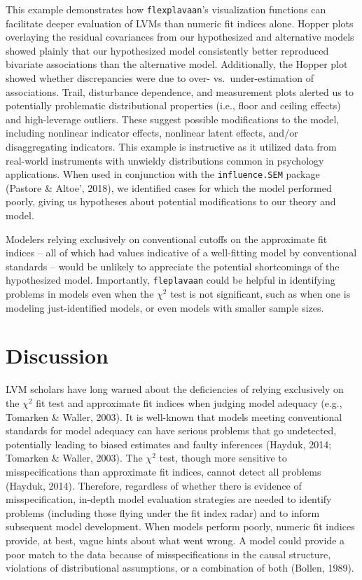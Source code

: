 \documentclass[
  english,
  man]{apa6}
\begin{document}
This example demonstrates how \texttt{flexplavaan}'s visualization functions can facilitate deeper evaluation of LVMs than numeric fit indices alone. Hopper plots overlaying the residual covariances from our hypothesized and alternative models showed plainly that our hypothesized model consistently better reproduced bivariate associations than the alternative model. Additionally, the Hopper plot showed whether discrepancies were due to over- vs.~under-estimation of associations. Trail, disturbance dependence, and measurement plots alerted us to potentially problematic distributional properties (i.e., floor and ceiling effects) and high-leverage outliers. These suggest possible modifications to the model, including nonlinear indicator effects, nonlinear latent effects, and/or disaggregating indicators. This example is instructive as it utilized data from real-world instruments with unwieldy distributions common in psychology applications. When used in conjunction with the \texttt{influence.SEM} package (Pastore \& Altoe', 2018), we identified cases for which the model performed poorly, giving us hypotheses about potential modifications to our theory and model.

Modelers relying exclusively on conventional cutoffs on the approximate fit indices -- all of which had values indicative of a well-fitting model by conventional standards -- would be unlikely to appreciate the potential shortcomings of the hypothesized model. Importantly, \texttt{fleplavaan} could be helpful in identifying problems in models even when the \(\chi^2\) test is not significant, such as when one is modeling just-identified models, or even models with smaller sample sizes.

\hypertarget{discussion}{%
\section{Discussion}\label{discussion}}

LVM scholars have long warned about the deficiencies of relying exclusively on the \(\chi^2\) fit test and approximate fit indices when judging model adequacy (e.g., Tomarken \& Waller, 2003). It is well-known that models meeting conventional standards for model adequacy can have serious problems that go undetected, potentially leading to biased estimates and faulty inferences (Hayduk, 2014; Tomarken \& Waller, 2003). The \(\chi^2\) test, though more sensitive to misspecifications than approximate fit indices, cannot detect all problems (Hayduk, 2014). Therefore, regardless of whether there is evidence of misspecification, in-depth model evaluation strategies are needed to identify problems (including those flying under the fit index radar) and to inform subsequent model development. When models perform poorly, numeric fit indices provide, at best, vague hints about what went wrong. A model could provide a poor match to the data because of misspecifications in the causal structure, violations of distributional assumptions, or a combination of both (Bollen, 1989).
\end{document}
